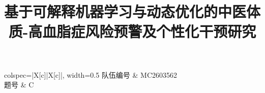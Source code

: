 \documentclass[12pt,a4paper]{ctexart}
\title{\songti\zihao{4}\bfseries 基于可解释机器学习与动态优化的中医体质-高血脂症风险预警及个性化干预研究}
\author{}
\date{}
\begin{document}
\pagestyle{empty}

\begin{center}
    \begin{tblr}{colspec={|X[c]|X[c]|}, width=0.5\linewidth}
        \hline 队伍编号 & MC2603562 \\ \hline 题号 & C \\ \hline
    \end{tblr}
\end{center}

\noindent
{}

\vspace{-1.0em} %
{\let\newpage\relax \maketitle}
\thispagestyle{empty} %
\end{document}

